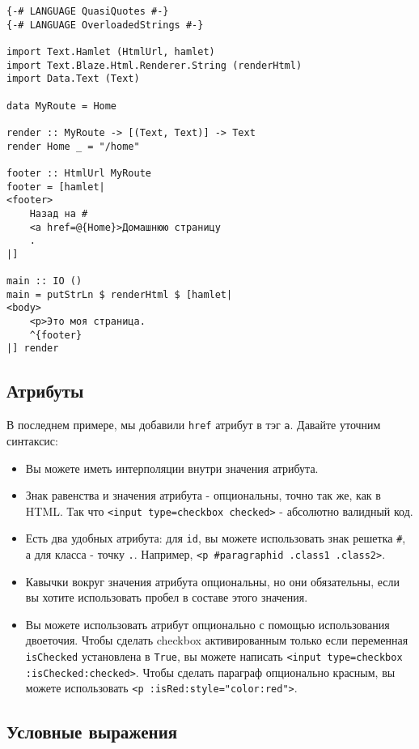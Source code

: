 \begin{lstlisting}
{-# LANGUAGE QuasiQuotes #-}
{-# LANGUAGE OverloadedStrings #-}

import Text.Hamlet (HtmlUrl, hamlet)
import Text.Blaze.Html.Renderer.String (renderHtml)
import Data.Text (Text)

data MyRoute = Home

render :: MyRoute -> [(Text, Text)] -> Text
render Home _ = "/home"

footer :: HtmlUrl MyRoute
footer = [hamlet|
<footer>
    Назад на #
    <a href=@{Home}>Домашнюю страницу
    .
|]

main :: IO ()
main = putStrLn $ renderHtml $ [hamlet|
<body>
    <p>Это моя страница.
    ^{footer}
|] render
\end{lstlisting}

\subsection{Атрибуты}
В последнем примере, мы добавили \texttt{href} атрибут в тэг \texttt{a}. Давайте
уточним синтаксис:

\begin{itemize}
\item Вы можете иметь интерполяции внутри значения атрибута. 
\item Знак равенства и значения атрибута - опциональны, точно так же, как в HTML.
Так что \lstinline!<input type=checkbox checked>! - абсолютно валидный код.
\item Есть два удобных атрибута: для \lstinline!id!, вы можете использовать знак 
решетка \texttt{#}, а для класса - точку \texttt{.}. Например, \lstinline!<p #paragraphid .class1 .class2>!.
\item Кавычки вокруг значения атрибута опциональны, но они обязательны, если вы
хотите использовать пробел в составе этого значения.
\item Вы можете использовать атрибут опционально с помощью использования двоеточия.
Чтобы сделать checkbox активированным только если переменная \lstinline!isChecked!
установлена в \lstinline!True!, вы можете написать
\lstinline!<input type=checkbox :isChecked:checked>!.
Чтобы сделать параграф опционально красным, вы можете использовать
\lstinline!<p :isRed:style="color:red">!.
\end{itemize}


\subsection{Условные выражения}


